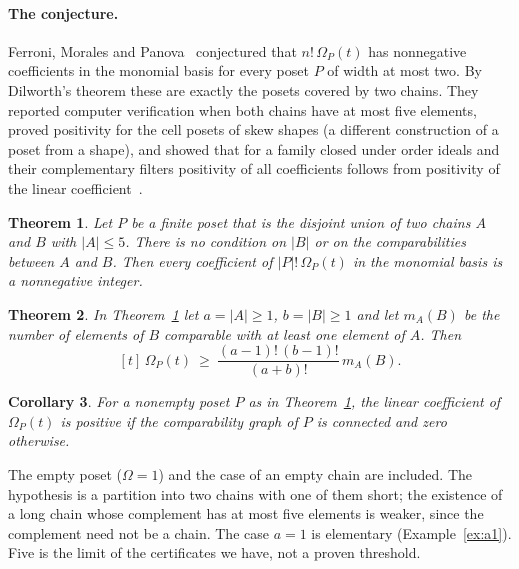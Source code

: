 \documentclass[11pt]{article}
\newtheorem{theorem}{Theorem}
\newtheorem{corollary}[theorem]{Corollary}
\theoremstyle{definition}
\theoremstyle{remark}
\begin{document}
\paragraph{The conjecture.} Ferroni, Morales and Panova~\cite[Section~7.1,
Conjecture~7.1]{FMP} conjectured that $n!\,\Omega_P(t)$ has nonnegative
coefficients in the monomial basis for every poset $P$ of width at most
two. By Dilworth's theorem these are exactly the posets covered by two
chains. They reported computer verification when both chains have at
most five elements, proved positivity for the cell posets of skew shapes
(a different construction of a poset from a shape), and showed that
for a family closed under order ideals and their complementary filters
positivity of all coefficients follows from positivity of the linear
coefficient~\cite[Proposition~3.3, Theorem~3.4]{FMP}.

\begin{theorem}\label{thm:main}
Let $P$ be a finite poset that is the disjoint union of two chains $A$ and
$B$ with $|A|\le5$. There is no condition on $|B|$ or on the
comparabilities between $A$ and $B$. Then every coefficient of
$|P|!\,\Omega_P(t)$ in the monomial basis is a nonnegative integer.
\end{theorem}

\begin{theorem}\label{thm:lb}
In Theorem~\ref{thm:main} let $a=|A|\ge1$, $b=|B|\ge1$ and let $m_A(B)$
be the number of elements of $B$ comparable with at least one element
of $A$. Then
\[
[t]\,\Omega_P(t)\ \ge\ \frac{(a-1)!\,(b-1)!}{(a+b)!}\,m_A(B).
\]
\end{theorem}

\begin{corollary}\label{cor:conn}
For a nonempty poset $P$ as in Theorem~\ref{thm:main}, the linear
coefficient of $\Omega_P(t)$ is positive if the comparability graph of
$P$ is connected and zero otherwise.
\end{corollary}

The empty poset ($\Omega=1$) and the case of an empty chain are included.
The hypothesis is a partition into two chains with one of them short;
the existence of a long chain whose complement has at most five elements
is weaker, since the complement need not be a chain. The case $a=1$ is
elementary (Example~\ref{ex:a1}). Five is the limit of the certificates
we have, not a proven threshold.
\end{document}
